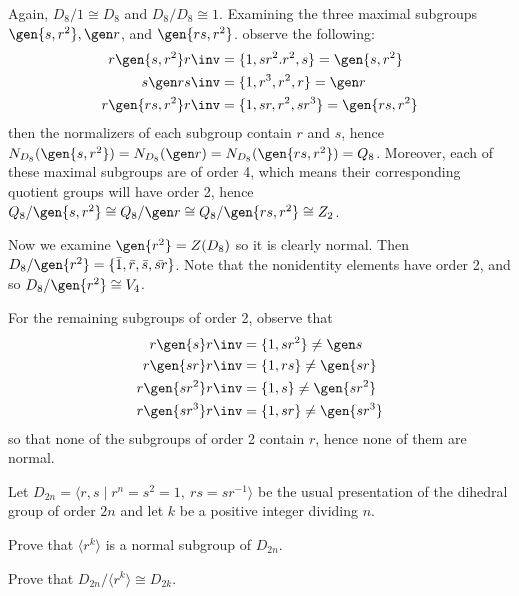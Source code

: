 \begin{sol}
    Again, $D_8/1 \cong D_8$ and $D_8/D_8 \cong 1$. Examining the three maximal subgroups $\gen{s, r^2}, \gen r$, and $\gen{rs, r^2}$. observe the following:
    \begin{align*}
        r\gen{s, r^2}r\inv & = \{1, sr^2. r^2, s\} = \gen{s, r^2} \\
        s\gen r s\inv & = \{1, r^3, r^2, r\} = \gen r \\
        r\gen{rs, r^2}r\inv & = \{1, sr, r^2, sr^3\} = \gen{rs, r^2}
    \end{align*}
    then the normalizers of each subgroup contain $r$ and $s$, hence $N_{D_8}(\gen{s, r^2}) = N_{D_8}(\gen r) = N_{D_8}(\gen{rs, r^2}) = Q_8$. Moreover, each of these maximal subgroups are of order 4, which means their corresponding quotient groups will have order 2, hence $Q_8/\gen{s, r^2} \cong Q_8/\gen r \cong Q_8/\gen{rs, r^2} \cong Z_2$.

    Now we examine $\gen{r^2} = Z(D_8)$ so it is clearly normal. Then $D_8/\gen{r^2} = \{\bar 1, \bar r, \bar s, \bar{sr}\}$. Note that the nonidentity elements have order 2, and so $D_8/\gen{r^2} \cong V_4$.

    For the remaining subgroups of order 2, observe that
    \begin{align*}
        r\gen{s}r\inv & = \{1, sr^2\} \neq \gen s \\
        r\gen{sr}r\inv & = \{1, rs\} \neq \gen{sr} \\
        r\gen{sr^2}r\inv & = \{1, s\} \neq \gen{sr^2} \\
        r\gen{sr^3}r\inv & = \{1, sr\} \neq \gen{sr^3}
    \end{align*}
    so that none of the subgroups of order 2 contain $r$, hence none of them are normal.
\end{sol}

\newpage

\begin{exercise}\label{ex3.1.34} 
    Let $D_{2n} = \langle r,s \mid r^n = s^2 = 1,\ rs = sr^{-1} \rangle$ be the usual presentation of the dihedral group of order $2n$ and let $k$ be a positive integer dividing $n$.
    \begin{subproblems}
        \item Prove that $\langle r^k \rangle$ is a normal subgroup of $D_{2n}$.
        \item Prove that $D_{2n}/\langle r^k \rangle \cong D_{2k}$.
    \end{subproblems}
\end{exercise}

